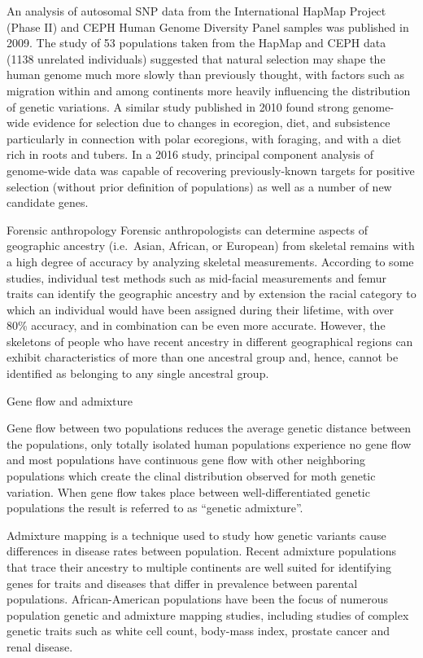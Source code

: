 An analysis of autosomal SNP data from the International HapMap Project (Phase II) and CEPH Human Genome Diversity Panel samples was published in 2009. The study of 53 populations taken from the HapMap and CEPH data (1138 unrelated individuals) suggested that natural selection may shape the human genome much more slowly than previously thought, with factors such as migration within and among continents more heavily influencing the distribution of genetic variations. A similar study published in 2010 found strong genome-wide evidence for selection due to changes in ecoregion, diet, and subsistence particularly in connection with polar ecoregions, with foraging, and with a diet rich in roots and tubers. In a 2016 study, principal component analysis of genome-wide data was capable of recovering previously-known targets for positive selection (without prior definition of populations) as well as a number of new candidate genes.

Forensic anthropology
Forensic anthropologists can determine aspects of geographic ancestry (i.e.~Asian, African, or European) from skeletal remains with a high degree of accuracy by analyzing skeletal measurements. According to some studies, individual test methods such as mid-facial measurements and femur traits can identify the geographic ancestry and by extension the racial category to which an individual would have been assigned during their lifetime, with over 80\% accuracy, and in combination can be even more accurate. However, the skeletons of people who have recent ancestry in different geographical regions can exhibit characteristics of more than one ancestral group and, hence, cannot be identified as belonging to any single ancestral group.

Gene flow and admixture

Gene flow between two populations reduces the average genetic distance between the populations, only totally isolated human populations experience no gene flow and most populations have continuous gene flow with other neighboring populations which create the clinal distribution observed for moth genetic variation. When gene flow takes place between well-differentiated genetic populations the result is referred to as ``genetic admixture''.

Admixture mapping is a technique used to study how genetic variants cause differences in disease rates between population. Recent admixture populations that trace their ancestry to multiple continents are well suited for identifying genes for traits and diseases that differ in prevalence between parental populations. African-American populations have been the focus of numerous population genetic and admixture mapping studies, including studies of complex genetic traits such as white cell count, body-mass index, prostate cancer and renal disease.

